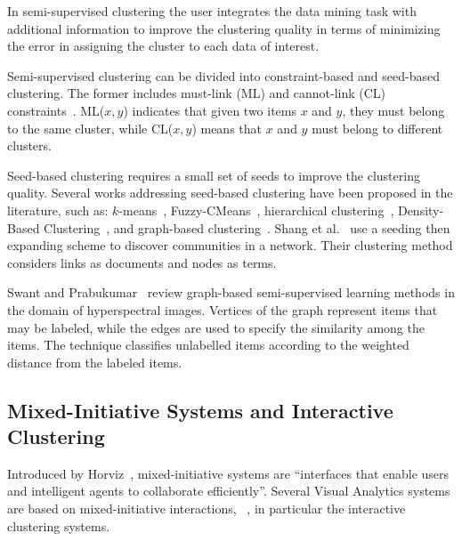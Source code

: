 In semi-supervised clustering the user integrates the data mining task with additional information to improve the clustering quality in terms of minimizing the error in assigning the cluster to each data of interest.

Semi-supervised clustering can be divided into constraint-based and seed-based clustering.
The former includes must-link (ML) and cannot-link (CL) constraints~\cite{basu08, wagstaff2001constrained}. ML($x,y$) indicates that given two items $x$ and $y$, they must belong to the same cluster, while CL($x,y$) means that $x$ and $y$ must belong to different clusters.

Seed-based clustering requires a small set of seeds to improve the clustering quality. Several works addressing seed-based clustering have been proposed in the literature, such as: $k$-means~\cite{basu08}, Fuzzy-CMeans~\cite{bensaidPartiallySupervisedClustering1996}, hierarchical clustering~\cite{bohm08}, Density-Based Clustering~\cite{lelisSemisupervisedDensityBasedClustering2009}, and graph-based clustering~\cite{wagstaff2001constrained}.
Shang et al.~\cite{shangEfficientlyDetectingOverlapping2017} use a seeding then expanding scheme to discover communities in a network. Their clustering method considers links as documents and nodes as terms.

Swant and Prabukumar~\cite{SAWANT2018} review graph-based semi-supervised learning methods in the domain of hyperspectral images.
Vertices of the graph represent items that may be labeled, while the edges are used to specify the similarity among the items.
The technique classifies unlabelled items according to the weighted distance from the labeled items.

\subsection{Mixed-Initiative Systems and Interactive Clustering}

Introduced by Horviz~\cite{horvitzPrinciplesMixedinitiativeUser1999}, mixed-initiative systems are ``interfaces that enable users and intelligent agents to collaborate efficiently''. Several Visual Analytics systems are based on mixed-initiative interactions, \eg~\cite{makoninMixedInitiativeBigData2016, cookMixedinitiativeVisualAnalytics2015, zhou13, wallPodiumRankingData2018}, in particular the interactive clustering systems.

